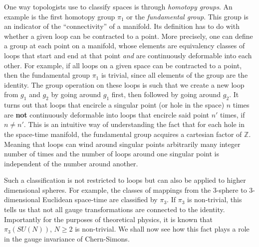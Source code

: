     One way topologists use to classify spaces is through \textit{homotopy groups}. An example is the first homotopy group $\pi_1$ or the \textit{fundamental group}. This group is an indicator of the ``connectivity'' of a manifold. Its definition has to do with whether a given loop can be contracted to a point. More precisely, one can define a group at each point on a manifold, whose elements are equivalency classes of loops that start and end at that point \textit{and} are continuously deformable into each other. For example, if all loops on a given space can be contracted to a point, then the fundamental group $\pi_1$ is trivial, since all elements of the group are the identity. The group operation on these loops is such that we create a new loop from $g_1$ and $g_2$ by going around $g_1$ first, then followed by going around $g_2$. It turns out that loops that encircle a singular point (or hole in the space) $n$ times are \textbf{not} continuously deformable into loops that encircle said point $n'$ times, if $n \neq n'$. This is an intuitive way of understanding the fact that for each hole in the space-time manifold, the fundamental group acquires a cartesian factor of $\mathbb{Z}$. Meaning that loops can wind around singular points arbitrarily many integer number of times and the number of loops around one singular point is independent of the number around another.

    Such a classification is not restricted to loops but can also be applied to higher dimensional spheres. For example, the classes of mappings from the 3-sphere to 3-dimensional Euclidean space-time are classified by $\pi_3$. If $\pi_3$ is non-trivial, this tells us that not all gauge transformations are connected to the identity. Importantly for the purposes of theoretical physics, it is known that $\pi_3\left(SU(N) \right)$, $N\geq2$ is non-trivial. We shall now see how this fact plays a role in the gauge invariance of Chern-Simons.

